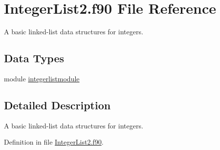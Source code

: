 \hypertarget{_integer_list2_8f90}{\section{Integer\+List2.\+f90 File Reference}
\label{_integer_list2_8f90}
}


A basic linked-\/list data structures for integers.  


\subsection*{Data Types}
\begin{DoxyCompactItemize}
\item 
module \hyperlink{classintegerlistmodule}{integerlistmodule}
\end{DoxyCompactItemize}


\subsection{Detailed Description}
A basic linked-\/list data structures for integers. 



Definition in file \hyperlink{_integer_list2_8f90_source}{Integer\+List2.\+f90}.

